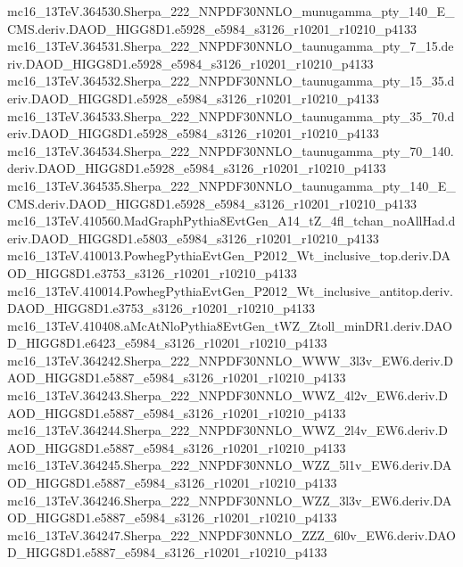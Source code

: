 \begin{footnotesize}
mc16\_13TeV.364530.Sherpa\_222\_NNPDF30NNLO\_munugamma\_pty\_140\_E\_CMS.deriv.DAOD\_HIGG8D1.e5928\_e5984\_s3126\_r10201\_r10210\_p4133 \\
mc16\_13TeV.364531.Sherpa\_222\_NNPDF30NNLO\_taunugamma\_pty\_7\_15.deriv.DAOD\_HIGG8D1.e5928\_e5984\_s3126\_r10201\_r10210\_p4133 \\
mc16\_13TeV.364532.Sherpa\_222\_NNPDF30NNLO\_taunugamma\_pty\_15\_35.deriv.DAOD\_HIGG8D1.e5928\_e5984\_s3126\_r10201\_r10210\_p4133 \\
mc16\_13TeV.364533.Sherpa\_222\_NNPDF30NNLO\_taunugamma\_pty\_35\_70.deriv.DAOD\_HIGG8D1.e5928\_e5984\_s3126\_r10201\_r10210\_p4133 \\
mc16\_13TeV.364534.Sherpa\_222\_NNPDF30NNLO\_taunugamma\_pty\_70\_140.deriv.DAOD\_HIGG8D1.e5928\_e5984\_s3126\_r10201\_r10210\_p4133 \\
mc16\_13TeV.364535.Sherpa\_222\_NNPDF30NNLO\_taunugamma\_pty\_140\_E\_CMS.deriv.DAOD\_HIGG8D1.e5928\_e5984\_s3126\_r10201\_r10210\_p4133 \\
mc16\_13TeV.410560.MadGraphPythia8EvtGen\_A14\_tZ\_4fl\_tchan\_noAllHad.deriv.DAOD\_HIGG8D1.e5803\_e5984\_s3126\_r10201\_r10210\_p4133 \\
mc16\_13TeV.410013.PowhegPythiaEvtGen\_P2012\_Wt\_inclusive\_top.deriv.DAOD\_HIGG8D1.e3753\_s3126\_r10201\_r10210\_p4133 \\
mc16\_13TeV.410014.PowhegPythiaEvtGen\_P2012\_Wt\_inclusive\_antitop.deriv.DAOD\_HIGG8D1.e3753\_s3126\_r10201\_r10210\_p4133 \\
mc16\_13TeV.410408.aMcAtNloPythia8EvtGen\_tWZ\_Ztoll\_minDR1.deriv.DAOD\_HIGG8D1.e6423\_e5984\_s3126\_r10201\_r10210\_p4133 \\
mc16\_13TeV.364242.Sherpa\_222\_NNPDF30NNLO\_WWW\_3l3v\_EW6.deriv.DAOD\_HIGG8D1.e5887\_e5984\_s3126\_r10201\_r10210\_p4133 \\
mc16\_13TeV.364243.Sherpa\_222\_NNPDF30NNLO\_WWZ\_4l2v\_EW6.deriv.DAOD\_HIGG8D1.e5887\_e5984\_s3126\_r10201\_r10210\_p4133 \\
mc16\_13TeV.364244.Sherpa\_222\_NNPDF30NNLO\_WWZ\_2l4v\_EW6.deriv.DAOD\_HIGG8D1.e5887\_e5984\_s3126\_r10201\_r10210\_p4133 \\
mc16\_13TeV.364245.Sherpa\_222\_NNPDF30NNLO\_WZZ\_5l1v\_EW6.deriv.DAOD\_HIGG8D1.e5887\_e5984\_s3126\_r10201\_r10210\_p4133 \\
mc16\_13TeV.364246.Sherpa\_222\_NNPDF30NNLO\_WZZ\_3l3v\_EW6.deriv.DAOD\_HIGG8D1.e5887\_e5984\_s3126\_r10201\_r10210\_p4133 \\
mc16\_13TeV.364247.Sherpa\_222\_NNPDF30NNLO\_ZZZ\_6l0v\_EW6.deriv.DAOD\_HIGG8D1.e5887\_e5984\_s3126\_r10201\_r10210\_p4133 \\

\end{footnotesize}

